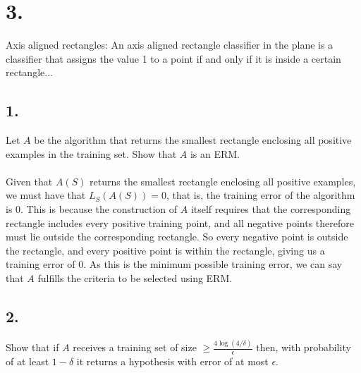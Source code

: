 \documentclass{article}
\begin{document}
{\Large 

\section*{3.}
Axis aligned rectangles: An axis aligned rectangle classifier in the plane is a classifier that assigns the value 1 to a point if and only if it is inside a certain rectangle...

\subsection*{1.}
Let \(A\) be the algorithm that returns the smallest rectangle enclosing all positive examples in the training set. Show that \(A\) is an ERM. \\ \\
Given that \(A(S)\) returns the smallest rectangle enclosing all positive examples, we must have that \(L_S(A(S)) = 0\), that is, the training error of the algorithm is 0. This is because the construction of \(A\) itself requires that the corresponding rectangle includes every positive training point, and all negative points therefore must lie outside the corresponding rectangle. So every negative point is outside the rectangle, and every positive point is within the rectangle, giving us a training error of 0. As this is the minimum possible training error, we can say that \(A\) fulfills the criteria to be selected using ERM.

\subsection*{2.}
Show that if \(A\) receives a training set of size \(\geq \frac{4 \log(4/\delta)}{\epsilon}\) then, with probability of at least \(1 - \delta\) it returns a hypothesis with error of at most \(\epsilon\).

}
\end{document}
